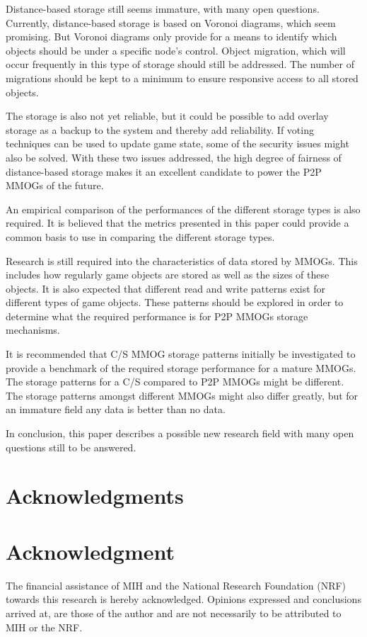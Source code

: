 \documentclass[10pt,a4paper,journal,cspaper,compsoc]{IEEEtran}
\begin{document}
Distance-based storage still seems immature, with many open questions. Currently, distance-based storage is based on Voronoi diagrams, which seem
promising. But Voronoi diagrams only provide for a means to identify which objects should be under a specific node's control. Object migration, which
will occur frequently in this type of storage should still be addressed. The number of migrations should be kept to a minimum to ensure responsive
access to all stored objects.

The storage is also not yet reliable, but it could be possible to add overlay storage as a backup to the system and thereby add reliability. If
voting techniques can be used to update game state, some of the security issues might also be solved. With these two issues addressed, the high
degree of fairness of distance-based storage makes it an excellent candidate to power the P2P MMOGs of the future.

An empirical comparison of the performances of the different storage types is also required. It is believed that the metrics presented in this paper
could provide a common basis to use in comparing the different storage types.

Research is still required into the characteristics of data stored by MMOGs. This includes how regularly game objects are stored as well as the sizes
of these objects. It is also expected that different read and write patterns exist for different types of game objects. These patterns should be
explored in order to determine what the required performance is for P2P MMOGs storage mechanisms.

It is recommended that C/S MMOG storage patterns initially be investigated to provide a benchmark of the required storage performance for a mature
MMOGs. The storage patterns for a C/S compared to P2P MMOGs might be different. The storage patterns amongst different MMOGs might also differ
greatly, but for an immature field any data is better than no data.

In conclusion, this paper describes a possible new research field with many open questions still to be answered.

\ifCLASSOPTIONcompsoc
  \section*{Acknowledgments}
\else
  \section*{Acknowledgment}
\fi

The financial assistance of MIH and the National Research Foundation (NRF) towards this research is hereby acknowledged. Opinions expressed and
conclusions arrived at, are those of the author and are not necessarily to be attributed to MIH or the NRF.




\end{document}
